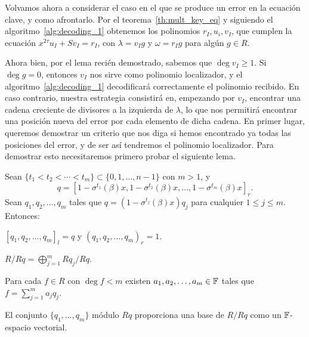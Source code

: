 Volvamos ahora a considerar el caso en el que se produce un error en la ecuación clave, y como afrontarlo. Por el teorema~\ref{th:mult_key_eq} y siguiendo el algoritmo~\ref{alg:decoding_1} obtenemos los polinomios \(r_I, u_i, v_I\), que cumplen la ecuación \(x^{2\tau}u_{I} + Sv_{I} = r_{I}\), con \(\lambda = v_I g\) y  \(\omega = r_I g\) para algún \(g \in R\).

Ahora bien, por el lema recién demostrado, sabemos que \(\deg v_I \ge 1\). Si \(\deg g = 0\), entonces \(v_I\) nos sirve como polinomio localizador, y el algoritmo~\ref{alg:decoding_1} decodificará correctamente el polinomio recibido. En caso contrario, nuestra estrategia consistirá en, empezando por \(v_I\), encontrar una cadena creciente de divisores a la izquierda de \(\lambda\), lo que nos permitirá encontrar una posición nueva del error por cada elemento de dicha cadena. En primer lugar, queremos demostrar un criterio que nos diga si hemos encontrado ya todas las posiciones del error, y de ser así tendremos el polinomio localizador. Para demostrar esto necesitaremos primero probar el siguiente lema.

\begin{lemma}
\label{lem:direct-sum}
    Sean \(\{t_1 < t_2 < \cdots < t_m \} \subset \{0, 1, \dots, n-1 \}\) con \(m > 1\), y
     \[
    q = {[1 - \sigma^{t_1}(\beta)x, 1 - \sigma^{t_2}(\beta)x, \ldots, 1 - \sigma^{t_m}(\beta)x]}_r
    .\]
    Sean \(q_1, q_2, \ldots, q_m\) tales que \(q = (1 - \sigma^{t_j}(\beta)x)q_j\) para cualquier \(1 \le j \le m\). Entonces:
\begin{nlist}
    \item \({[q_1, q_2, \ldots, q_m]}_l = q\) y \({(q_1, q_2, \ldots, q_m)}_r = 1\).
    \item \(R/Rq = \bigoplus_{j = 1}^{m} Rq_j/Rq\).
    \item Para cada \(f \in R\) con \(\deg f < m\) existen  \(a_1, a_2, \ldots, a_m \in \mathbb{F}\) tales que \(f = \sum_{j=1}^{m}a_j q_j\).
    \item El conjunto \(\{q_1, \ldots, q_m\}\) módulo \(Rq\) proporciona una base de  \(R/Rq\) como un \(\mathbb{F}\)-espacio vectorial.
\end{nlist}
\end{lemma}

